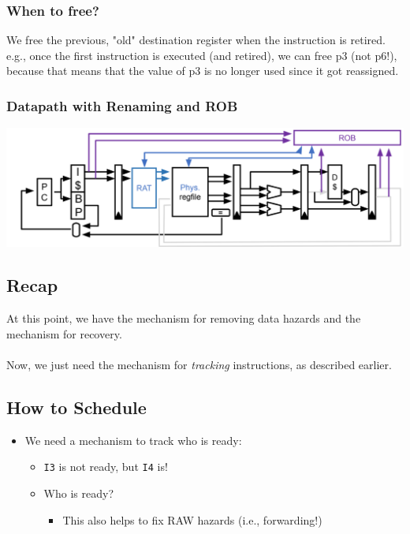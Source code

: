 \documentclass[10pt]{article}
\begin{document}
\subsubsection*{When to free?}
We free the previous, "old" destination register when the instruction is retired.  e.g., once the first instruction is executed (and retired), we can free p3 (not p6!), because that means that the value of p3 is no longer used since it got reassigned.
\subsubsection*{Datapath with Renaming and ROB}
\begin{center}
    \includegraphics*[scale=0.7]{W5_7.png}
\end{center}    
\subsection*{Recap}
At this point, we have the mechanism for removing data hazards and the mechanism for recovery.\\\\
Now, we just need the mechanism for \textit{tracking} instructions, as described earlier.

\subsection*{How to Schedule}
\begin{itemize}
    \item We need a mechanism to track who is ready:
    \begin{itemize}
        \item \texttt{I3} is not ready, but \texttt{I4} is!
        \item Who is ready?
        \begin{itemize}
            \item This also helps to fix RAW hazards (i.e., forwarding!)
        \end{itemize}
    \end{itemize}
\end{itemize}
\end{document}

